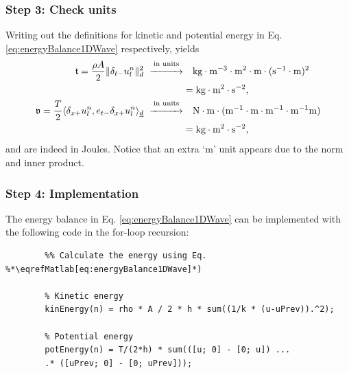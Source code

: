 {{{{\subsubsection{Step 3: Check units}
Writing out the definitions for kinetic and potential energy in Eq. \eqref{eq:energyBalance1DWave} respectively, yields
\begin{align*}
    \mathfrak{t} = \frac{\rho A}{2}\lVert\delta_{t-} u_l^n\rVert^2_d \ \overset{\text{in units}}{\xrightarrow{\hspace*{1cm}}}& \quad \text{kg}\cdot \text{m}^{-3} \cdot \text{m}^2\cdot \text{m} \cdot(\text{s}^{-1}\cdot \text{m})^{2}\\
    & = \text{kg}\cdot\text{m}^2\cdot\text{s}^{-2},\\
    \mathfrak{v} = \frac{T}{2}\langle\delta_{x+}u_l^n, e_{t-}\delta_{x+}u_l^n\rangle_{\underline{d}}\ \overset{\text{in units}}{\xrightarrow{\hspace*{1cm}}}& \quad \text{N} \cdot \text{m}\cdot (\text{m}^{-1}\cdot\text{m}\cdot \text{m}^{-1}\cdot\text{m}^{-1}\text{m}) \\
    & = \text{kg} \cdot \text{m}^2 \cdot \text{s}^{-2},
\end{align*}
and are indeed in Joules. Notice that an extra `m' unit appears due to the norm and inner product.

\subsubsection{Step 4: Implementation}
The energy balance in Eq. \eqref{eq:energyBalance1DWave} can be implemented with the following code in the for-loop recursion:
\\

\begin{minipage}{\textwidth}
    \setlstMAT
    \begin{lstlisting}
        %% Calculate the energy using Eq. %*\eqrefMatlab[eq:energyBalance1DWave]*) 
        
        % Kinetic energy
        kinEnergy(n) = rho * A / 2 * h * sum((1/k * (u-uPrev)).^2);
        
        % Potential energy
        potEnergy(n) = T/(2*h) * sum(([u; 0] - [0; u]) ...
        .* ([uPrev; 0] - [0; uPrev]));
        

\end{lstlisting}
\end{minipage}}}}}
